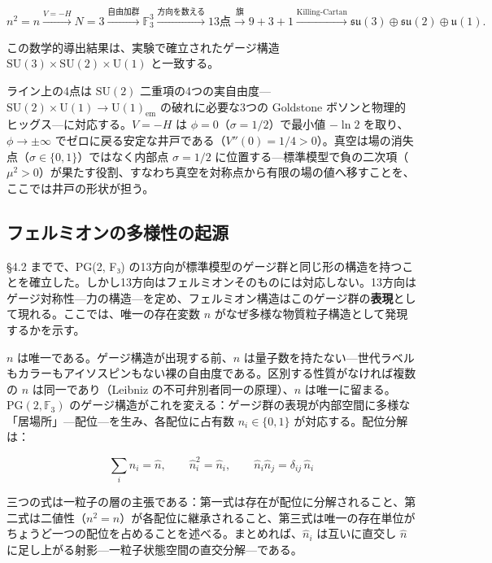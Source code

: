 \documentclass[fontsize=11pt,paper=a4,lualatex]{jlreq}
\begin{document}
\[n^2{=}n \xrightarrow{V=-H} N{=}3 \xrightarrow{\text{自由加群}} \mathbb{F}_3^3 \xrightarrow{\text{方向を数える}} 13\text{点} \xrightarrow{\text{旗}} 9{+}3{+}1 \xrightarrow{\text{Killing-Cartan}} \mathfrak{su}(3)\oplus\mathfrak{su}(2)\oplus\mathfrak{u}(1).\]

この数学的導出結果は、実験で確立されたゲージ構造 $\mathrm{SU}(3) \times \mathrm{SU}(2) \times \mathrm{U}(1)$ と一致する。

ライン上の4点は $\mathrm{SU}(2)$ 二重項の4つの実自由度---$\mathrm{SU}(2){\times}\mathrm{U}(1) \to \mathrm{U}(1)_\mathrm{em}$ の破れに必要な3つの Goldstone ボソンと物理的ヒッグス---に対応する。$V = -H$ は $\phi = 0$（$\sigma = 1/2$）で最小値 $-\ln 2$ を取り、$\phi \to \pm\infty$ でゼロに戻る安定な井戸である（$V''(0) = 1/4 > 0$）。真空は場の消失点（$\sigma \in \{0,1\}$）ではなく内部点 $\sigma = 1/2$ に位置する---標準模型で負の二次項（$\mu^2 > 0$）が果たす役割、すなわち真空を対称点から有限の場の値へ移すことを、ここでは井戸の形状が担う。


\subsection{フェルミオンの多様性の起源}\label{sec:fermion-diversity}

§4.2 までで、PG(2, F₃) の13方向が標準模型のゲージ群と同じ形の構造を持つことを確立した。しかし13方向はフェルミオンそのものには対応しない。13方向はゲージ対称性---力の構造---を定め、フェルミオン構造はこのゲージ群の\textbf{表現}として現れる。ここでは、唯一の存在変数 $n$ がなぜ多様な物質粒子構造として発現するかを示す。

$n$ は唯一である。ゲージ構造が出現する前、$n$ は量子数を持たない---世代ラベルもカラーもアイソスピンもない裸の自由度である。区別する性質がなければ複数の $n$ は同一であり（Leibniz の不可弁別者同一の原理）、$n$ は唯一に留まる。$\mathrm{PG}(2, \mathbb{F}_3)$ のゲージ構造がこれを変える：ゲージ群の表現が内部空間に多様な「居場所」---配位---を生み、各配位に占有数 $n_i \in \{0,1\}$ が対応する。配位分解は：

\[\sum_{i} \hat{n}_i = \hat{n}, \qquad \hat{n}_i^2 = \hat{n}_i, \qquad \hat{n}_i \hat{n}_j = \delta_{ij}\,\hat{n}_i\]

三つの式は一粒子の層の主張である：第一式は存在が配位に分解されること、第二式は二値性（$n^2 = n$）が各配位に継承されること、第三式は唯一の存在単位がちょうど一つの配位を占めることを述べる。まとめれば、$\hat n_i$ は互いに直交し $\hat n$ に足し上がる射影---一粒子状態空間の直交分解---である。
\end{document}
